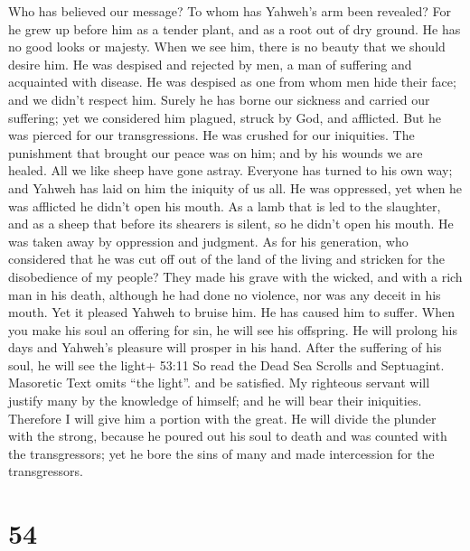  Who has believed our message? To whom has Yahweh's arm been
revealed?  For he grew up before him as a tender plant, and
as a root out of dry ground. He has no good looks or majesty. When we
see him, there is no beauty that we should desire him.  He
was despised and rejected by men, a man of suffering and acquainted with
disease. He was despised as one from whom men hide their face; and we
didn't respect him.  Surely he has borne our sickness and
carried our suffering; yet we considered him plagued, struck by God, and
afflicted.  But he was pierced for our transgressions. He
was crushed for our iniquities. The punishment that brought our peace
was on him; and by his wounds we are healed.  All we like
sheep have gone astray. Everyone has turned to his own way; and Yahweh
has laid on him the iniquity of us all.  He was oppressed,
yet when he was afflicted he didn't open his mouth. As a lamb that is
led to the slaughter, and as a sheep that before its shearers is silent,
so he didn't open his mouth.  He was taken away by
oppression and judgment. As for his generation, who considered that he
was cut off out of the land of the living and stricken for the
disobedience of my people?  They made his grave with the
wicked, and with a rich man in his death, although he had done no
violence, nor was any deceit in his mouth.  Yet it pleased
Yahweh to bruise him. He has caused him to suffer. When you make his
soul an offering for sin, he will see his offspring. He will prolong his
days and Yahweh's pleasure will prosper in his hand.  After
the suffering of his soul, he will see the light+ 53:11 So read the Dead
Sea Scrolls and Septuagint. Masoretic Text omits ``the light''. and be
satisfied. My righteous servant will justify many by the knowledge of
himself; and he will bear their iniquities.  Therefore I
will give him a portion with the great. He will divide the plunder with
the strong, because he poured out his soul to death and was counted with
the transgressors; yet he bore the sins of many and made intercession
for the transgressors.

\hypertarget{section-50}{%
\section{54}\label{section-50}}

